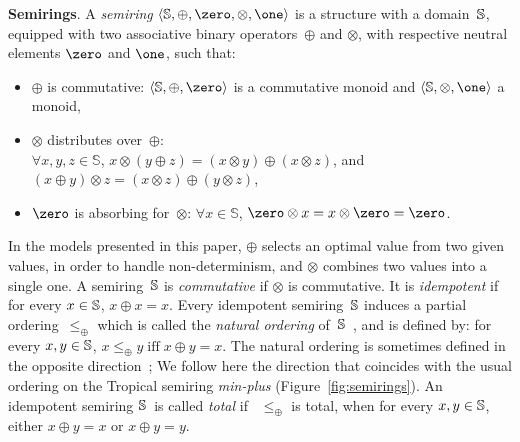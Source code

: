 %
\noindent
\textbf{Semirings}. A \emph{semiring} $\< \Semiring, \oplus, \zero, \otimes, \one>$
is a structure with a domain~$\mathbb{S}$,
equipped with two associative
binary operators~$\oplus$ and $\otimes$,
with respective neutral elements $\zero$ and $\one$, such that:
\begin{itemize}
\item $\oplus$ is commutative:
 $\< \Semiring, \oplus, \zero>$ is a commutative monoid
   and $\< \Semiring, \otimes, \one>$ a monoid,
\item $\otimes$ distributes over~$\oplus$: \\ $\forall x, y, z \in \mathbb{S}$,
$x \otimes (y \oplus z) = (x \otimes y) \oplus (x \otimes z)$,
and $(x \oplus y) \otimes z = (x \otimes z) \oplus (y \otimes z)$,
\item $\zero$ is absorbing for~$\otimes$:
$\forall x\in \mathbb{S}$, $\zero \otimes x = x \otimes \zero = \zero$.
\end{itemize}
%
In the models presented in this paper,
$\oplus$ selects an optimal value from two given values,
in order to handle non-determinism,
and $\otimes$ combines two values into a single one.
A semiring~$\mathbb{S}$ is \emph{commutative} if $\otimes$ is commutative.
It is \emph{idempotent} if for every $x \in \mathbb{S}$, $x \oplus x = x$.
%
Every idempotent semiring~$\mathbb{S}$ induces
a partial ordering~$\leq_\oplus$
which is called the \emph{natural ordering} of~$\mathbb{S}$~\cite{Mohri02semiring},
and is defined by:
for every $x, y\in \mathbb{S}$,
$x \leq_\oplus y \;\mbox{iff}\; x \oplus y = x$.
%
The natural ordering is sometimes defined in the opposite direction~\cite{DrosteKuich09semirings};
We follow here the direction  %
that coincides with the usual ordering on the Tropical semiring \emph{min-plus}
(Figure~\ref{fig:semirings}).
%
\noindent
An idempotent semiring $\mathbb{S}$~is called \emph{total} if
~$\leq_\oplus$ is total,
\ie when for every $x, y \in \mathbb{S}$, either $x \oplus y = x$ or $x \oplus y = y$.

